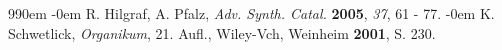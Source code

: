 \documentclass[12pt]{article}
\begin{document}
\begin{onehalfspace}
\renewcommand{\section}[2]{}%
\def\bibindent{0em}
\begin{thebibliography}{99\kern\bibindent}
\makeatletter
\let\old@biblabel\@biblabel
\def\@biblabel#1{\old@biblabel{#1}\kern\bibindent}
\let\old@bibitem\bibitem
\def\bibitem#1{\old@bibitem{#1}\leavevmode\kern-\bibindent}
\makeatother
{}
R. Hilgraf, A. Pfalz, \textit{Adv. Synth. Catal.} \textbf{2005}, \textit{37}, 61 - 77.
K. Schwetlick, \textit{Organikum}, 21. Aufl., Wiley-Vch, Weinheim \textbf{2001}, S. 230.
\end{thebibliography}
\end{onehalfspace}
\end{document}
